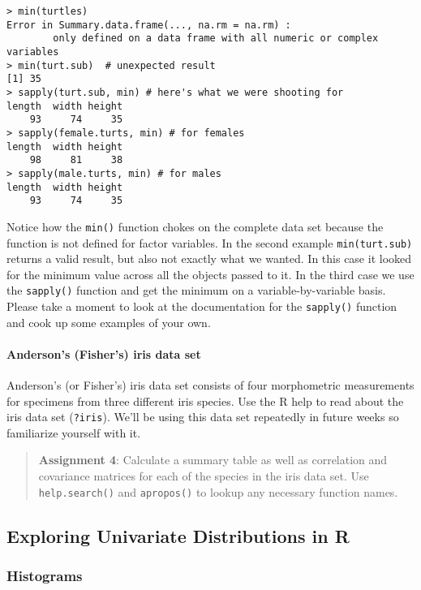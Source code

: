\begin{lstlisting}
> min(turtles)
Error in Summary.data.frame(..., na.rm = na.rm) : 
        only defined on a data frame with all numeric or complex variables
> min(turt.sub)  # unexpected result
[1] 35
> sapply(turt.sub, min) # here's what we were shooting for
length  width height 
    93     74     35
> sapply(female.turts, min) # for females
length  width height 
    98     81     38 
> sapply(male.turts, min) # for males
length  width height 
    93     74     35      
\end{lstlisting}
Notice how the \lstinline!min()! function chokes on the complete data
set because the function is not defined for factor variables. In the
second example \lstinline!min(turt.sub)! returns a valid result, but
also not exactly what we wanted. In this case it looked for the minimum
value across all the objects passed to it. In the third case we use the
\lstinline!sapply()! function and get the minimum on a
variable-by-variable basis. Please take a moment to look at the
documentation for the \lstinline!sapply()! function and cook up some
examples of your own.

\paragraph{Anderson's (Fisher's) iris data set}

Anderson's (or Fisher's) iris data set consists of four morphometric
measurements for specimens from three different iris species. Use the R
help to read about the iris data set (\lstinline!?iris!). We'll be using
this data set repeatedly in future weeks so familiarize yourself with
it.

\begin{quote}
\textbf{Assignment 4}: Calculate a summary table as well as correlation
and covariance matrices for each of the species in the iris data set.
Use \lstinline!help.search()! and \lstinline!apropos()! to lookup any
necessary function names.

\end{quote}
\subsection{Exploring Univariate Distributions in R}

\subsubsection{Histograms}

